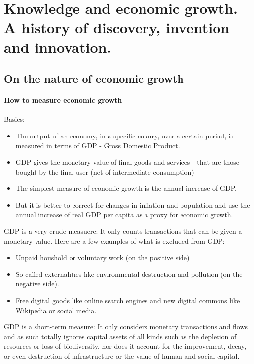 \section{Knowledge and economic growth. A history of discovery,
invention and innovation.}

\subsection{On the nature of economic growth}

\paragraph{How to measure economic growth}

Basics:
\begin{itemize}
    \item The output of an economy, in a specific counry, over a certain period,
        is measured in terms of GDP - Gross Domestic Product.
    \item GDP gives the monetary value of final goods and services - that
        are those bought by the final user (net of intermediate consumption)
    \item The simplest measure of economic growth is the annual increase
        of GDP.
    \item But it is better to correct for changes in inflation and population
        and use the annual increase of real GDP per capita as a proxy for
        economic growth.
\end{itemize}
GDP is a very crude measuere: It only counts transactions that can be given a
monetary value. Here are a few examples of what is excluded from GDP:
\begin{itemize}
    \item Unpaid houshold or voluntary work (on the positive side)
    \item So-called externalities like environmental destruction and
        pollution (on the negative side).
    \item Free digital goods like online search engines and new digital
        commons like Wikipedia or social media.
\end{itemize}

GDP is a short-term measure:
It only considers monetary transactions and flows and as such totally ignores
capital assets of all kinds such as the depletion of resources or loss of
biodiversity, nor does it account for the improvement, decay, or even destruction
of infrastructure or the value of human and social capital.

